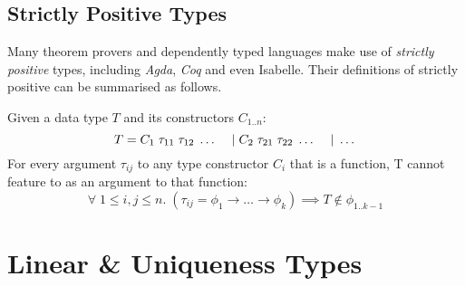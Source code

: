 \subsection{Strictly Positive Types}

Many theorem provers and dependently typed languages make use of \textit{strictly positive} types, including 
\textit{Agda}\citep{AgdaStrictlyPositive}, \textit{Coq}\citep{CoqStrictlyPositive} and even
Isabelle\citep{IsabelleStrictlyPositive}. Their definitions of strictly positive can be summarised as follows.

Given a data type $T$ and its constructors $C_{1..n}$:
$$
T = C_1\; \tau_{11} \; \tau_{12} \; \dots \\
\hspace{1.2em} \vert\; C_2\; \tau_{21} \; \tau_{22} \; \dots \\
\hspace{1.2em} \vert\; \dots
$$
For every argument $\tau_{ij}$ to any type constructor $C_i$ that is a function,
T cannot feature to as an argument to that function:
$$
\forall\; 1 \leq i,j \leq n.\;
 (\tau_{ij} = \phi_{1} \rightarrow \dots \rightarrow \phi_{k})
 \implies T \notin \phi_{1..k-1}
$$


\section{Linear \& Uniqueness Types}
